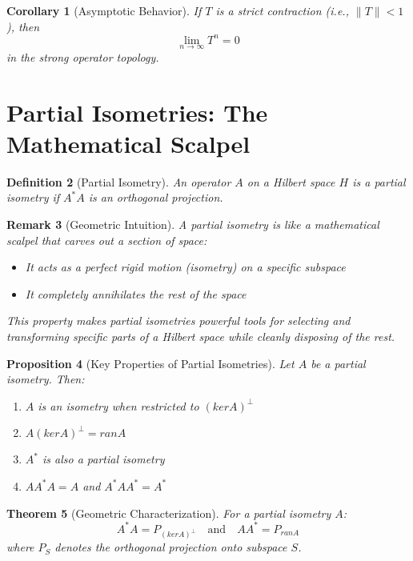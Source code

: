 \documentclass{article}
\newtheorem{theorem}{Theorem}
\newtheorem{definition}[theorem]{Definition}
\newtheorem{corollary}[theorem]{Corollary}
\newtheorem{remark}[theorem]{Remark}
\newtheorem{proposition}[theorem]{Proposition}
\begin{document}
\begin{corollary}[Asymptotic Behavior]
If $T$ is a strict contraction (i.e., $\|T\| < 1$), then
\[ \lim_{n \to \infty} T^n = 0 \]
in the strong operator topology.
\end{corollary}

\section{Partial Isometries: The Mathematical Scalpel}

\begin{definition}[Partial Isometry]
An operator $A$ on a Hilbert space $H$ is a partial isometry if $A^*A$ is an orthogonal projection.
\end{definition}

\begin{remark}[Geometric Intuition]
A partial isometry is like a mathematical scalpel that carves out a section of space:
\begin{itemize}
    \item It acts as a perfect rigid motion (isometry) on a specific subspace
    \item It completely annihilates the rest of the space
\end{itemize}
This property makes partial isometries powerful tools for selecting and transforming specific parts of a Hilbert space while cleanly disposing of the rest.
\end{remark}

\begin{proposition}[Key Properties of Partial Isometries]
Let $A$ be a partial isometry. Then:
\begin{enumerate}
    \item $A$ is an isometry when restricted to $(ker A)^\perp$
    \item $A(ker A)^\perp = ran A$
    \item $A^*$ is also a partial isometry
    \item $AA^*A = A$ and $A^*AA^* = A^*$
\end{enumerate}
\end{proposition}

\begin{theorem}[Geometric Characterization]
For a partial isometry $A$:
\[ A^*A = P_{(ker A)^\perp} \quad \text{and} \quad AA^* = P_{ran A} \]
where $P_S$ denotes the orthogonal projection onto subspace $S$.
\end{theorem}
\end{document}
